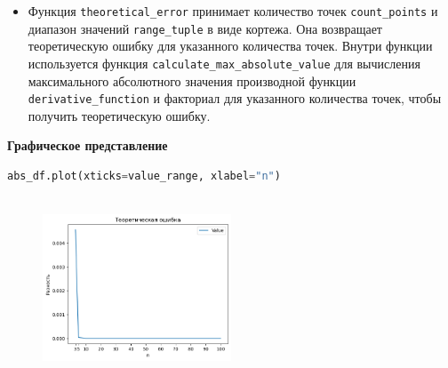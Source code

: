 \documentclass{article}
\begin{document}
\begin{itemize}
\item Функция \texttt{theoretical\_error} принимает количество точек
\texttt{count\_points} и диапазон значений 
\texttt{range\_tuple} в виде кортежа. Она возвращает теоретическую ошибку для указанного количества точек. Внутри функции используется функция \texttt{calculate\_max\_absolute\_value} для вычисления максимального абсолютного значения производной функции \texttt{derivative\_function} и факториал для указанного количества точек, чтобы получить теоретическую ошибку.
\end{itemize}

\textbf{Графическое представление}

\begin{lstlisting}[language=Python]
abs_df.plot(xticks=value_range, xlabel="n")
    
\end{lstlisting}

\begin{figure}[h]
    \centering
    \includegraphics[width=0.5\textwidth]{output3.png}
    \label{fig:my_label}
\end{figure}
\end{document}
